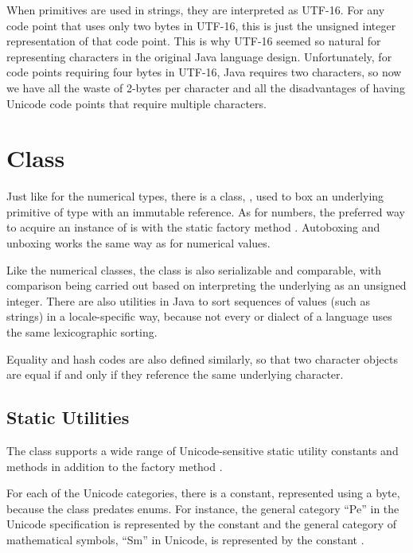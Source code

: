 When  primitives are used in strings, they are interpreted
as UTF-16.  For any code point that uses only two bytes in UTF-16,
this is just the unsigned integer representation of that code point.
This is why UTF-16 seemed so natural for representing characters in
the original Java language design.  Unfortunately, for code points
requiring four bytes in UTF-16, Java requires two characters, so now
we have all the waste of 2-bytes per character and all the
disadvantages of having Unicode code points that require multiple
characters.


\section{ Class}

Just like for the numerical types, there is a class,
, used to box an underlying primitive
of type  with an immutable reference.  As for numbers, the
preferred way to acquire an instance of  is with the
static factory method .  Autoboxing and
unboxing works the same way as for numerical values.  

Like the numerical classes, the  class is also
serializable and comparable, with comparison being carried out based
on interpreting the underlying  as an unsigned integer.
There are also utilities in Java to sort sequences of 
values (such as strings) in a locale-specific way, because not every
or dialect of a language uses the same lexicographic sorting.

Equality and hash codes are also defined similarly, so that two
character objects are equal if and only if they reference the same
underlying character.

\subsection{Static Utilities}\label{section:char-character-utils}

The  class supports a wide range of Unicode-sensitive
static utility constants and methods in addition to the factory method
.

For each of the Unicode categories, there is a constant, represented
using a byte, because the class predates enums.  For instance, the
general category ``Pe'' in the Unicode specification is represented by
the constant  and the general category of
mathematical symbols, ``Sm'' in Unicode, is represented by the
constant .

